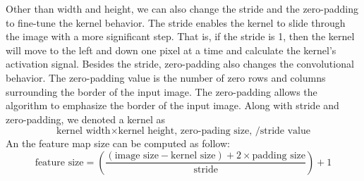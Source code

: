 Other than width and height, we can also change the stride and the zero-padding to fine-tune the kernel behavior. The stride enables the kernel to slide through the image with a more significant step. That is, if the stride is 1, then the kernel will move to the left and down one pixel at a time and calculate the kernel's activation signal. Besides the stride, zero-padding also changes the convolutional behavior. The zero-padding value is the number of zero rows and columns surrounding the border of the input image. The zero-padding allows the algorithm to emphasize the border of the input image. Along with stride and zero-padding, we denoted a kernel as 
\[
    \text{kernel width} \times \text{kernel height, zero-pading size, /stride value}
\]
An the feature map size can be computed as follow:
%
\begin{equation} \label{feature_size_eq}
    \text{feature size} = \left(\frac{(\text{image size} - \text{kernel size}) + 2 \times \text{padding size}}{\text{stride}} \right) + 1
\end{equation}

